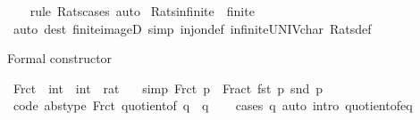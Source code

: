 \begin{isabellebody}
%
\isadelimproof
\ \ %
\endisadelimproof
%
\isatagproof
{}\isamarkupfalse%
\ {\isacharparenleft}{\kern0pt}rule\ Rats{\isacharunderscore}{\kern0pt}cases{\isacharparenright}{\kern0pt}\ auto%
\endisatagproof
{\isafoldproof}%
%
\isadelimproof
\isanewline
%
\endisadelimproof
\isanewline
{}\isamarkupfalse%
\ Rats{\isacharunderscore}{\kern0pt}infinite{\isacharcolon}{\kern0pt}\ {\isachardoublequoteopen}{\isasymnot}\ finite\ {\isasymrat}{\isachardoublequoteclose}\isanewline
%
\isadelimproof
\ \ %
\endisadelimproof
%
\isatagproof
{}\isamarkupfalse%
\ {\isacharparenleft}{\kern0pt}auto\ dest{\isacharbang}{\kern0pt}{\isacharcolon}{\kern0pt}\ finite{\isacharunderscore}{\kern0pt}imageD\ simp{\isacharcolon}{\kern0pt}\ inj{\isacharunderscore}{\kern0pt}on{\isacharunderscore}{\kern0pt}def\ infinite{\isacharunderscore}{\kern0pt}UNIV{\isacharunderscore}{\kern0pt}char{\isacharunderscore}{\kern0pt}{}\ Rats{\isacharunderscore}{\kern0pt}def{\isacharparenright}{\kern0pt}%
\endisatagproof
{\isafoldproof}%
%
\isadelimproof
%
\endisadelimproof
%
\isadelimdocument
%
\endisadelimdocument
%
\isatagdocument
%
\isamarkuptrue%
%
\endisatagdocument
{\isafolddocument}%
%
\isadelimdocument
%
\endisadelimdocument
%
\begin{isamarkuptext}%
Formal constructor%
\end{isamarkuptext}\isamarkuptrue%
\isamarkupfalse%
\ Frct\ {\isacharcolon}{\kern0pt}{\isacharcolon}{\kern0pt}\ {\isachardoublequoteopen}int\ {\isasymtimes}\ int\ {\isasymRightarrow}\ rat{\isachardoublequoteclose}\isanewline
\ \ \ {\isacharbrackleft}{\kern0pt}simp{\isacharbrackright}{\kern0pt}{\isacharcolon}{\kern0pt}\ {\isachardoublequoteopen}Frct\ p\ {\isacharequal}{\kern0pt}\ Fract\ {\isacharparenleft}{\kern0pt}fst\ p{\isacharparenright}{\kern0pt}\ {\isacharparenleft}{\kern0pt}snd\ p{\isacharparenright}{\kern0pt}{\isachardoublequoteclose}\isanewline
\isanewline
{}\isamarkupfalse%
\ {\isacharbrackleft}{\kern0pt}code\ abstype{\isacharbrackright}{\kern0pt}{\isacharcolon}{\kern0pt}\ {\isachardoublequoteopen}Frct\ {\isacharparenleft}{\kern0pt}quotient{\isacharunderscore}{\kern0pt}of\ q{\isacharparenright}{\kern0pt}\ {\isacharequal}{\kern0pt}\ q{\isachardoublequoteclose}\isanewline
%
\isadelimproof
\ \ %
\endisadelimproof
%
\isatagproof
{}\isamarkupfalse%
\ {\isacharparenleft}{\kern0pt}cases\ q{\isacharparenright}{\kern0pt}\ {\isacharparenleft}{\kern0pt}auto\ intro{\isacharcolon}{\kern0pt}\ quotient{\isacharunderscore}{\kern0pt}of{\isacharunderscore}{\kern0pt}eq{\isacharparenright}{\kern0pt}%

\end{isabellebody}
